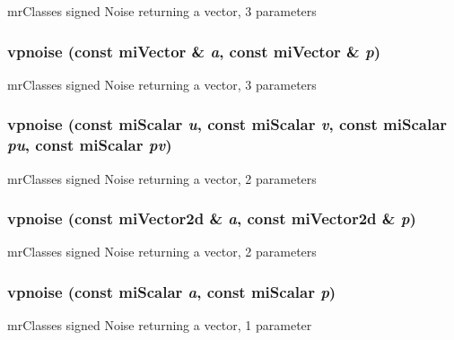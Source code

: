 mr\-Classes signed Noise returning a vector, 3 parameters 

\subsubsection{ vpnoise (const mi\-Vector \& {\em a}, const mi\-Vector \& {\em p})\hspace{0.3cm}{\tt  [inline]}}\label{namespacersl_a108}


mr\-Classes signed Noise returning a vector, 3 parameters 

\subsubsection{ vpnoise (const mi\-Scalar {\em u}, const mi\-Scalar {\em v}, const mi\-Scalar {\em pu}, const mi\-Scalar {\em pv})\hspace{0.3cm}{\tt  [inline]}}\label{namespacersl_a107}


mr\-Classes signed Noise returning a vector, 2 parameters 

\subsubsection{ vpnoise (const mi\-Vector2d \& {\em a}, const mi\-Vector2d \& {\em p})\hspace{0.3cm}{\tt  [inline]}}\label{namespacersl_a106}


mr\-Classes signed Noise returning a vector, 2 parameters 

\subsubsection{ vpnoise (const mi\-Scalar {\em a}, const mi\-Scalar {\em p})\hspace{0.3cm}{\tt  [inline]}}\label{namespacersl_a105}


mr\-Classes signed Noise returning a vector, 1 parameter 

